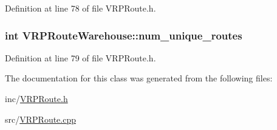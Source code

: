 Definition at line 78 of file VRPRoute.h.

\hypertarget{class_v_r_p_route_warehouse_a5af11f134bc36342b2c90e594e76e368}{
\subsubsection[{num\_\-unique\_\-routes}]{\setlength{\rightskip}{0pt plus 5cm}int {\bf VRPRouteWarehouse::num\_\-unique\_\-routes}}}
\label{class_v_r_p_route_warehouse_a5af11f134bc36342b2c90e594e76e368}


Definition at line 79 of file VRPRoute.h.



The documentation for this class was generated from the following files:\begin{DoxyCompactItemize}
\item 
inc/\hyperlink{_v_r_p_route_8h}{VRPRoute.h}\item 
src/\hyperlink{_v_r_p_route_8cpp}{VRPRoute.cpp}\end{DoxyCompactItemize}
